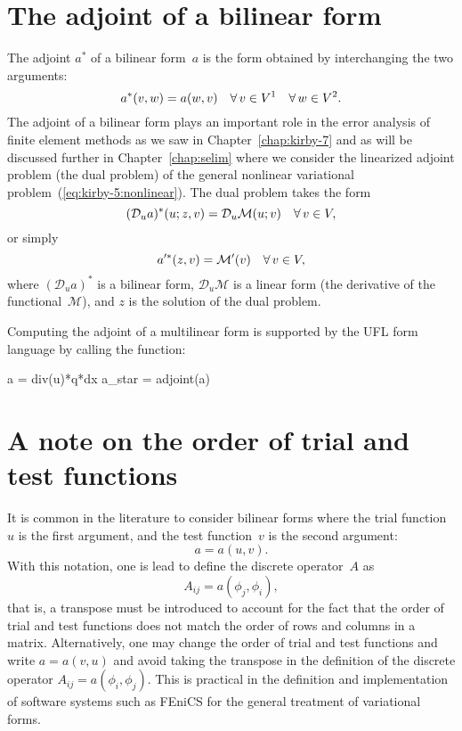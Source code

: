 \section{The adjoint of a bilinear form}

The adjoint $a^*$ of a bilinear form~$a$ is the form obtained by
interchanging the two arguments:
\begin{equation}
  a^*(v, w) = a(w, v) \quad \forall\, v \in V^1 \quad \forall\, w \in V^2.
\end{equation}
The adjoint of a bilinear form plays an important role in the error
analysis of finite element methods as we saw in
Chapter~\ref{chap:kirby-7} and as will be discussed further in
Chapter~\ref{chap:selim} where we consider the linearized adjoint
problem (the dual problem) of the general nonlinear variational
problem~(\ref{eq:kirby-5:nonlinear}). The dual problem takes the form
\begin{equation}
  (\mathcal{D}_u a)^* (u; z, v) = \mathcal{D}_u \mathcal{M} (u; v) \quad \forall\, v \in V,
\end{equation}
or simply
\begin{equation}
  a'^* (z, v) = \mathcal{M}' (v) \quad \forall\, v \in V,
\end{equation}
where $(\mathcal{D}_u a)^*$ is a bilinear form, $\mathcal{D}_u
\mathcal{M}$ is a linear form (the derivative of the
functional~$\mathcal{M}$), and $z$ is the solution of the dual
problem.

Computing the adjoint of a multilinear form is supported by the UFL
form language by calling the  function:
\begin{python}
a = div(u)*q*dx
a_star = adjoint(a)
\end{python}

\section{A note on the order of trial and test functions}

It is common in the literature to consider bilinear forms where the
trial function~$u$ is the first argument, and the test function~$v$ is
the second argument:
\begin{equation}
  a = a(u, v).
\end{equation}
With this notation, one is lead to define the discrete operator~$A$ as
\begin{equation}
  A_{ij} = a(\phi_j, \phi_i),
\end{equation}
that is, a transpose must be introduced to account for the fact that
the order of trial and test functions does not match the order of rows
and columns in a matrix. Alternatively, one may change the order of
trial and test functions and write $a = a(v, u)$ and avoid taking the
transpose in the definition of the discrete operator $A_{ij} =
a(\phi_i, \phi_j)$. This is practical in the definition and
implementation of software systems such as FEniCS for the general
treatment of variational forms.

